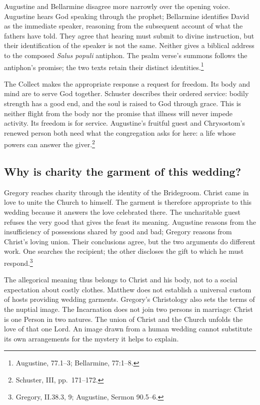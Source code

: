 Augustine and Bellarmine disagree more narrowly over the opening voice.
Augustine hears God speaking through the prophet; Bellarmine identifies
David as the immediate speaker, reasoning from the subsequent account
of what the fathers have told. They agree that hearing must submit to
divine instruction, but their identification of the speaker is not the
same. Neither gives a biblical address to the composed \textit{Salus
populi} antiphon. The psalm verse's summons follows the antiphon's
promise; the two texts retain their distinct identities.\footnote{Augustine,
 77.1--3; Bellarmine,  77:1--8.}

The Collect makes the appropriate response a request for freedom.
Its body and mind are to serve God together. Schuster describes their
ordered service: bodily strength has a good end, and the soul is raised
to God through grace. This is neither flight from the body nor the
promise that illness will never impede activity. Its freedom is for
service. Augustine's fruitful guest and Chrysostom's renewed person
both need what the congregation asks for here: a life whose powers
can answer the giver.\footnote{Schuster,  III,
pp.~171--172.}

\subsection{Why is charity the garment of this wedding?}

Gregory reaches charity through the identity of the Bridegroom.
Christ came in love to unite the Church to himself. The garment is
therefore appropriate to this wedding because it answers the love
celebrated there. The uncharitable guest refuses the very good that
gives the feast its meaning. Augustine reasons from the insufficiency
of possessions shared by good and bad; Gregory reasons from Christ's
loving union. Their conclusions agree, but the two arguments do
different work. One searches the recipient; the other discloses the
gift to which he must respond.\footnote{Gregory,  II.38.3, 9; Augustine, Sermon 90.5--6.}

The allegorical meaning thus belongs to Christ and his body, not to
a social expectation about costly clothes. Matthew does not establish
a universal custom of hosts providing wedding garments. Gregory's
Christology also sets the terms of the nuptial image. The Incarnation
does not join two persons in marriage: Christ is one Person in two
natures. The union of Christ and the Church unfolds the love of that
one Lord. An image drawn from a human wedding cannot substitute its
own arrangements for the mystery it helps to explain.

